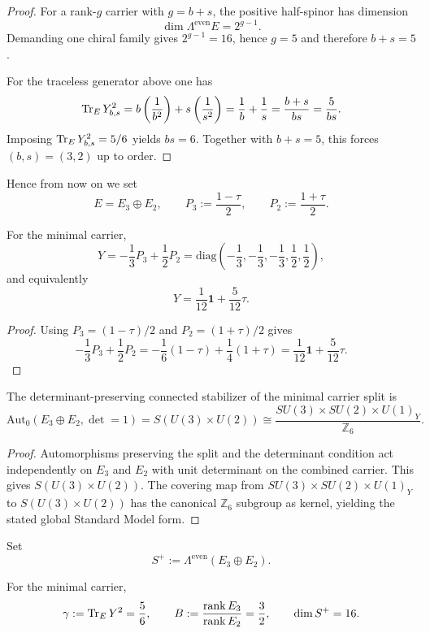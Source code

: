 \begin{proof}
For a rank-$g$ carrier with $g=b+s$, the positive half-spinor has dimension
\[
\dim \Lambda^{\mathrm{even}}E = 2^{g-1}.
\]
Demanding one chiral family gives $2^{g-1}=16$, hence $g=5$ and therefore $b+s=5$.

For the traceless generator above one has
\[
\operatorname{Tr}_E Y_{b,s}^2 = b\left(\frac{1}{b^2}\right)+s\left(\frac{1}{s^2}\right)
= \frac1b+\frac1s
= \frac{b+s}{bs}
= \frac{5}{bs}.
\]
Imposing $\operatorname{Tr}_EY_{b,s}^2=5/6$ yields $bs=6$. Together with $b+s=5$, this forces $(b,s)=(3,2)$ up to order.
\end{proof}

Hence from now on we set
\[
E=E_3\oplus E_2,
\qquad
P_3:=\frac{1-\tau}{2},
\qquad
P_2:=\frac{1+\tau}{2}.
\]

\begin{proposition}
For the minimal carrier,
\[
Y=-\frac13 P_3+\frac12 P_2
=\mathrm{diag}\!\left(-\frac13,-\frac13,-\frac13,\frac12,\frac12\right),
\]
and equivalently
\[
Y=\frac{1}{12}\mathbf 1+\frac{5}{12}\tau.
\]
\end{proposition}

\begin{proof}
Using $P_3=(1-\tau)/2$ and $P_2=(1+\tau)/2$ gives
\[
-\frac13 P_3+\frac12 P_2
= -\frac16(1-\tau)+\frac14(1+\tau)
= \frac{1}{12}\mathbf 1+\frac{5}{12}\tau.
\]
\end{proof}

\begin{theorem}
The determinant-preserving connected stabilizer of the minimal carrier split is
\[
\mathrm{Aut}_0(E_3\oplus E_2,\det=1)
= S(U(3)\times U(2))
\cong \frac{SU(3)\times SU(2)\times U(1)_Y}{\mathbb Z_6}.
\]
\end{theorem}

\begin{proof}
Automorphisms preserving the split and the determinant condition act independently on $E_3$ and $E_2$ with unit determinant on the combined carrier. This gives $S(U(3)\times U(2))$. The covering map from $SU(3)\times SU(2)\times U(1)_Y$ to $S(U(3)\times U(2))$ has the canonical $\mathbb Z_6$ subgroup as kernel, yielding the stated global Standard Model form.
\end{proof}

Set
\[
S^+ := \Lambda^{\mathrm{even}}(E_3\oplus E_2).
\]

\begin{proposition}
For the minimal carrier,
\[
\gamma := \operatorname{Tr}_EY^2 = \frac56,
\qquad
B := \frac{\operatorname{rank} E_3}{\operatorname{rank} E_2} = \frac32,
\qquad
\dim S^+ = 16.
\]
\end{proposition}

